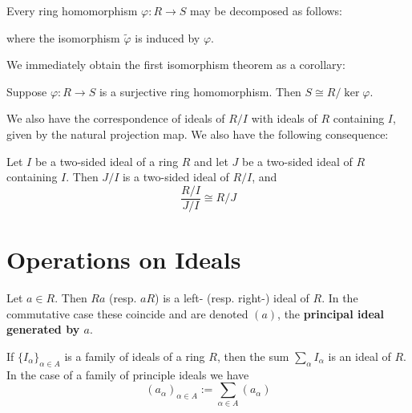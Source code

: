 \documentclass[12pt, a4paper, oneside, openright, titlepage]{book}
\begin{document}
\begin{thm}
    Every ring homomorphism $\varphi:R\rightarrow S$ may be decomposed as follows:
    \begin{center}
\end{center}
    where the isomorphism $\widetilde{\varphi}$ is induced by $\varphi$.
\end{thm}

We immediately obtain the first isomorphism theorem as a corollary:

\begin{cor}
    Suppose $\varphi:R\rightarrow S$ is a surjective ring homomorphism. Then $S\cong R/\ker \varphi$.
\end{cor}

We also have the correspondence of ideals of $R/I$ with ideals of $R$ containing $I$, given by the natural projection map. We also have the following consequence:

\begin{prop}
    Let $I$ be a two-sided ideal of a ring $R$ and let $J$ be a two-sided ideal of $R$ containing $I$. Then $J/I$ is a two-sided ideal of $R/I$, and \begin{equation*}
        \frac{R/I}{J/I}\cong R/J
    \end{equation*}
\end{prop}


\section{Operations on Ideals}

Let $a \in R$. Then $Ra$ (resp. $aR$) is a left- (resp. right-) ideal of $R$. In the commutative case these coincide and are denoted $(a)$, the \textbf{principal ideal generated by $a$}.

If $\{I_{\alpha}\}_{\alpha \in A}$ is a family of ideals of a ring $R$, then the sum $\sum_{\alpha}I_{\alpha}$ is an ideal of $R$. In the case of a family of principle ideals we have $$(a_{\alpha})_{\alpha \in A} := \sum_{\alpha \in A}(a_{\alpha})$$
\end{document}
